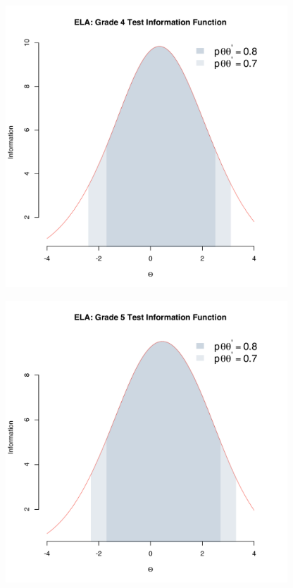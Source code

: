 \documentclass[]{article}
\begin{document}
\begin{figure}
\centering
\includegraphics[height=4.16667in]{tifs/ela4tif.pdf}
\caption{}
\end{figure}

\begin{figure}
\centering
\includegraphics[height=4.16667in]{tifs/ela5tif.pdf}
\caption{}
\end{figure}
\end{document}
